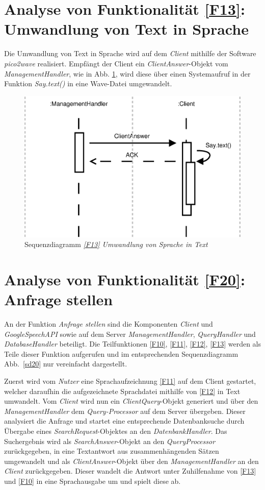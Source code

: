 \section{Analyse von Funktionalität \ref{F13}: Umwandlung von Text in Sprache}

Die Umwandlung von Text in Sprache wird auf dem \textit{Client} mithilfe der
Software \textit{pico2wave} realisiert. Empfängt der Client ein
\textit{ClientAnswer}-Objekt vom \textit{ManagementHandler}, wie in Abb.
\ref{sd13}, wird diese über einen Systemaufruf in der Funktion
\textit{Say.text()} in eine Wave-Datei umgewandelt.

\begin{figure}[h]
\centering
\includegraphics[width=.5\textwidth]{Systementwurf/02_produktfunktionsanalyse/f130}
\caption{Sequenzdiagramm \textit{\ref{F13} Umwandlung von Sprache in Text}
\label{sd13}}
\end{figure}

\FloatBarrier

\section{Analyse von Funktionalität \ref{F20}: Anfrage stellen}

An der Funktion \textit{Anfrage stellen} sind die Komponenten \textit{Client}
und
\textit{GoogleSpeechAPI} sowie auf dem Server \textit{ManagementHandler},
\textit{QueryHandler} und \textit{DatabaseHandler} beteiligt. Die Teilfunktionen
\ref{F10}, \ref{F11}, \ref{F12}, \ref{F13} werden als Teile dieser Funktion
aufgerufen und im entsprechenden Sequenzdiagramm Abb.~\ref{sd20} nur vereinfacht
dargestellt.

Zuerst wird vom \textit{Nutzer} eine Sprachaufzeichnung \ref{F11} auf dem Client
gestartet, welcher daraufhin die aufgezeichnete Sprachdatei mithilfe von
\ref{F12} in Text umwandelt. Vom \textit{Client} wird nun ein
\textit{ClientQuery}-Objekt generiert und über den \textit{ManagementHandler}
dem \textit{Query-Processor} auf dem Server übergeben. Dieser analysiert die
Anfrage und startet eine entsprechende Datenbanksuche durch Übergabe eines
\textit{SearchRequest}-Objektes an den \textit{DatenbankHandler}. Das
Suchergebnis wird als \textit{SearchAnswer}-Objekt an den \textit{QueryProcessor}
zurückgegeben, in eine Textantwort aus zusammenhängenden Sätzen umgewandelt und
als \textit{ClientAnswer}-Objekt über den \textit{ManagementHandler} an den
\textit{Client} zurückgegeben. Dieser wandelt die Antwort unter Zuhilfenahme von
\ref{F13} und \ref{F10} in eine Sprachausgabe um und spielt diese ab.

